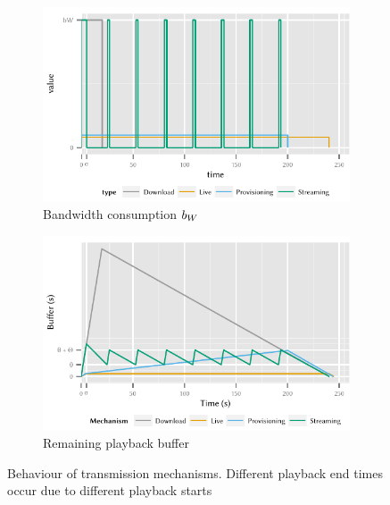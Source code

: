 \begin{figure}
	\begin{subfigure}[b]{\textwidth}
	\centering
	\includegraphics{application/lte_video/system_model/figures/video_model_bandwidth}
	\caption{Bandwidth consumption \(b_W\)}\label{fig:application:lte_video:system_model:video_model:bandwidth}
	\end{subfigure} 
	\begin{subfigure}[b]{\textwidth}
	\centering
	\includegraphics{application/lte_video/system_model/figures/video_model_playback}
	\caption{Remaining playback buffer}\label{fig:application:lte_video:system_model:video_model:playback}
	\end{subfigure}

	\caption{Behaviour of transmission mechanisms. Different playback end times occur due to different playback starts}\label{fig:application:lte_video:system_model:video_model}
\end{figure}

